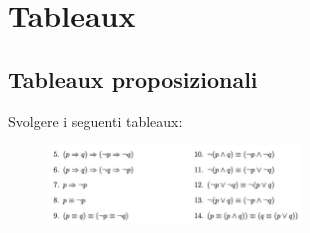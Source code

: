 \documentclass[12pt,a4paper]{article}
\begin{document}
\section{Tableaux}
    \subsection{Tableaux proposizionali}
    \begin{Exercise}
    Svolgere i seguenti tableaux:
        \begin{figure}[h!]
            \centering
            \includegraphics[width=0.6\textwidth]{images/esTableaux.jpeg}
            \label{fig:esTableaux1}
        \end{figure}
    \end{Exercise}
    
    
\end{document}
